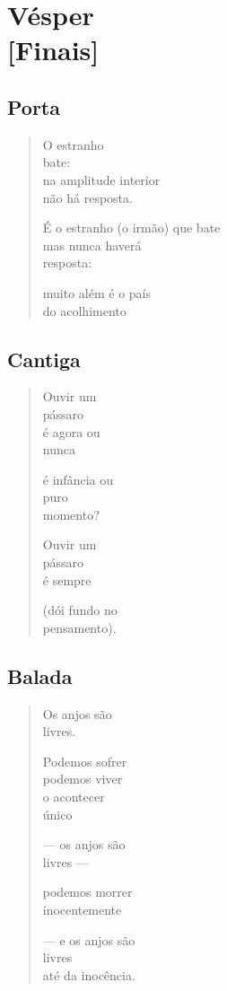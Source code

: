 \part*{Vésper\\ {[}Finais{]}}

\chapter{Porta}

\begin{verse}
O estranho\\
bate:\\
na amplitude interior\\
não há resposta.

É o estranho (o irmão) que bate\\
mas nunca haverá\\
resposta:

muito além é o país\\
do acolhimento
\end{verse}

\chapter{Cantiga}

\begin{verse}
Ouvir um\\
pássaro\\
é agora ou\\
nunca

é infância ou\\
puro\\
momento?

Ouvir um\\
pássaro\\
é sempre

(dói fundo no\\
pensamento).
\end{verse}

\chapter{Balada}

\begin{verse}
Os anjos são\\
livres.

Podemos sofrer\\
podemos viver\\
o acontecer\\
único

--- os anjos são\\
livres ---

podemos morrer\\
inocentemente

--- e os anjos são\\
livres\\
até da inocência.
\end{verse}

